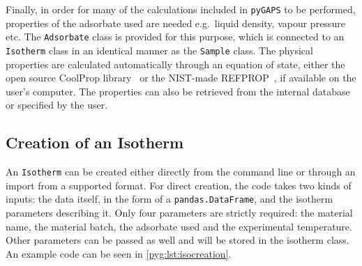 Finally, in order for many of the calculations included in 
\texttt{pyGAPS} to be performed, properties of the adsorbate 
used are needed e.g.\ liquid density, vapour pressure etc.
The \texttt{Adsorbate} class is provided for this purpose,
which is connected to an \texttt{Isotherm} class in an identical manner 
as the \texttt{Sample} class. The physical properties are calculated 
automatically through an equation of state,
either the open source CoolProp library~\cite{bellPurePseudopureFluid2014} 
or the \gls{NIST}-made REFPROP~\cite{lemmonNISTReferenceFluid1989}, if available
on the user's computer. The properties can also be retrieved 
from the internal database or specified by the user.

\subsection{Creation of an Isotherm}

An \texttt{Isotherm} can be created either directly from the command 
line or through an import from a supported format. For direct
creation, the code takes
two kinds of inputs: the data itself, in the form of a 
\texttt{pandas.DataFrame}, and the isotherm parameters describing it.
Only four parameters are strictly required:
the material name, the material batch, the adsorbate used and the 
experimental temperature. Other parameters can be passed as well 
and will be stored in the isotherm class. An example code can 
be seen in \autoref{pyg:lst:isocreation}.

